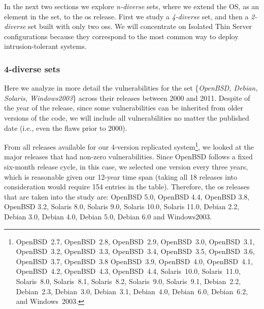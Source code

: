 In the next two sections we explore \emph{n-diverse} sets, where we extend the OS, as an element in the set, to the \gls{os} release. 
First we study a \emph{4-diverse} set, and then a \emph{2-diverse} set built with only two \glspl{os}. 
We will concentrate on Isolated Thin Server configurations because they correspond to the most common way to deploy intrusion-tolerant systems.


\subsubsection*{4-diverse sets}
Here we analyze in more detail the vulnerabilities for the set \{\emph{OpenBSD, Debian, Solaris, Windows2003}\} across their releases between 2000 and 2011. 
Despite of the year of the release, since some vulnerabilities can be inherited from older versions of the code, we will include all vulnerabilities no matter the published date (i.e., even the flaws prior to 2000).

From all releases available for our 4-version replicated system\footnote[1]{OpenBSD~2.7, OpenBSD~2.8, OpenBSD~2.9, OpenBSD~3.0, OpenBSD~3.1, OpenBSD~3.2, OpenBSD~3.3, OpenBSD~3.4, OpenBSD~3.5, OpenBSD~3.6, OpenBSD~3.7, OpenBSD~3.8 OpenBSD~3.9, OpenBSD~4.0, OpenBSD~4.1, OpenBSD~4.2, OpenBSD~4.3, OpenBSD~4.4,   Solaris~10.0, Solaris~11.0, Solaris~8.0, Solaris~8.1, Solaris~8.2, Solaris~9.0, Solaris~9.1, Debian~2.2, Debian~2.3, Debian~3.0,   Debian~3.1, Debian~4.0, Debian~6.0, Debian~6.2, and Windows~2003.}, we looked at the major releases that had non-zero vulnerabilities. 
Since OpenBSD follows a fixed six-month release cycle, in this case, we selected one version every three years, which is reasonable given our 12-year time span (taking all 18 releases into consideration would require 154 entries in the table). 
Therefore, the \gls{os} releases that are taken into the study are: OpenBSD 5.0, OpenBSD 4.4, OpenBSD 3.8, OpenBSD 3.2, Solaris 8.0, Solaris 9.0, Solaris 10.0, Solaris 11.0, Debian 2.2, Debian 3.0, Debian 4.0, Debian 5.0, Debian 6.0 and Windows2003.

